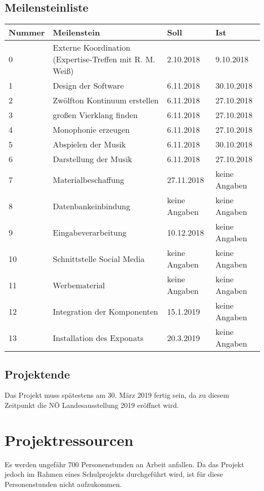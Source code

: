 \documentclass[a4paper]{scrartcl}
\begin{document}
\subsection{Meilensteinliste}
\begin{center}
	\begin{tabular}{|l|l|l|l|}
		\hline
		Nummer & Meilenstein & Soll & Ist\\
		\hline
		0 & Externe Koordination (Expertise-Treffen mit R. M. Weiß) & 2.10.2018 & 9.10.2018\\
		1 & Design der Software & 6.11.2018 & 30.10.2018\\
		2 & Zwölfton Kontinuum erstellen & 6.11.2018 & 27.10.2018\\
		3 & großen Vierklang finden & 6.11.2018 & 27.10.2018\\
		4 & Monophonie erzeugen & 6.11.2018 & 27.10.2018\\
		5 & Abspielen der Musik & 6.11.2018 & 30.10.2018\\
		6 & Darstellung der Musik & 6.11.2018 & 27.10.2018\\
		7 & Materialbeschaffung & 27.11.2018 & keine Angaben\\
		8 & Datenbankeinbindung & keine Angaben & keine Angaben\\
		9 & Eingabeverarbeitung & 10.12.2018 & keine Angaben\\
		10 & Schnittstelle Social Media & keine Angaben & keine Angaben\\
		11 & Werbematerial & keine Angaben & keine Angaben\\
		12 & Integration der Komponenten & 15.1.2019 & keine Angaben\\
		13 & Installation des Exponats & 20.3.2019 & keine Angaben\\
		
		\hline
	\end{tabular}
\end{center}

\subsection{Projektende}
Das Projekt muss spätestens am 30. März 2019 fertig sein, da zu diesem Zeitpunkt die NÖ Landesausstellung 2019 eröffnet wird.


\section{Projektressourcen}

Es werden ungefähr 700 Personenstunden an Arbeit anfallen. Da das Projekt jedoch im Rahmen eines Schulprojekts durchgeführt wird, ist für diese Personenstunden nicht aufzukommen.
\end{document}
